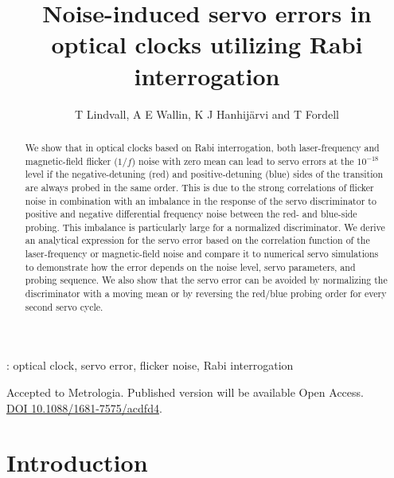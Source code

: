 \documentclass[10pt,a4paper]{iopart}
\begin{document}
\title[]{Noise-induced servo errors in optical clocks utilizing Rabi interrogation}

\author{T Lindvall, A E Wallin, K J Hanhij\"arvi and T Fordell}

\address{VTT Technical Research Centre of Finland Ltd, National Metrology Institute VTT MIKES, P.O.\ Box 1000, FI-02044 VTT, Finland}

\begin{abstract}
We show that in optical clocks based on Rabi interrogation, both laser-frequency and magnetic-field flicker ($1/f$) noise with zero mean can lead to servo errors at the $10^{-18}$ level if the negative-detuning (red) and positive-detuning (blue) sides of the transition are always probed in the same order. This is due to the strong correlations of flicker noise in combination with an imbalance in the response of the servo discriminator to positive and negative differential frequency noise between the red- and blue-side probing. This imbalance is particularly large for a normalized discriminator.
We derive an analytical expression for the servo error based on the correlation function of the laser-frequency or magnetic-field noise and compare it to numerical servo simulations to demonstrate how the error depends on the noise level, servo parameters, and probing sequence. We also show that the servo error can be avoided by normalizing the discriminator with a moving mean or by reversing the red/blue probing order for every second servo cycle.
\end{abstract}

%
\vspace{2pc}
: optical clock, servo error, flicker noise, Rabi interrogation

\vspace{2pc}
\noindent Accepted to Metrologia. Published version will be available Open Access.\\
\noindent \href{https://doi.org/10.1088/1681-7575/acdfd4}{DOI 10.1088/1681-7575/acdfd4}.
%
%
%
\ioptwocol


\section{Introduction \label{sec:intro}}
\end{document}
